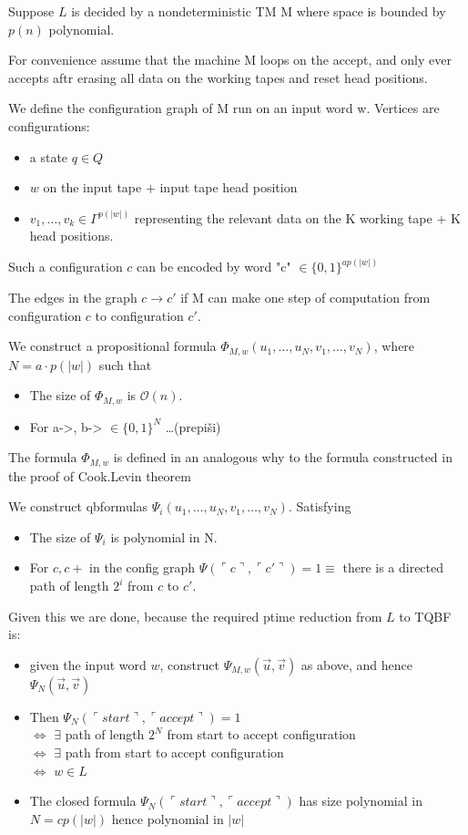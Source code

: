 \documentclass[a4paper,12pt]{article}
\theoremstyle{definition}
\theoremstyle{remark}
\begin{document}
Suppose $L$ is decided by a nondeterministic TM M where space is bounded by $p(n)$ polynomial.

For convenience assume that the machine M loops on the accept, and only ever accepts aftr erasing all data on the working tapes and reset head positions.

We define the configuration graph of M run on an input word w. Vertices are configurations:
\begin{itemize}
    \item a state $q \in Q$
    \item $w$ on the input tape + input tape head position
    \item $v_1, \dots, v_k \in \Gamma^{p(|w|)}$ representing the relevant data on the K working tape + K head positions. 
\end{itemize}

Such a configuration $c$ can be encoded by word "c" $\in \{0, 1\}^{a p(|w|)}$

The edges in the graph $c \to c'$ if M can make one step of computation from configuration $c$ to configuration $c'$.

We construct a propositional formula $\Phi_{M, w}(u_1, \dots, u_N, v_1, \dots, v_N)$, where $N = a \cdot p(|w|)$ such that
\begin{itemize}
    \item The size of $\Phi_{M, w}$ is $\mathscr{O}(n)$.
    \item For a->, b-> $\in \{0, 1\}^N$ \dots (prepiši)
\end{itemize}

The formula $\Phi_{M, w}$ is defined in an analogous why to the formula constructed in the proof of Cook.Levin theorem

We construct qbformulas $\Psi_i (u_1, \dots, u_N, v_1, \dots, v_N)$. Satisfying
\begin{itemize}
    \item The size of $\Psi_i$ is polynomial in N.
    \item For $c, c+$ in the config graph $\Psi(\ulcorner c \urcorner, \ulcorner c'\urcorner) = 1 \equiv $ there is a directed path of length $2^i$ from $c$ to $c'$.
\end{itemize}

Given this we are done, because the required ptime reduction from $L$ to TQBF is:
\begin{itemize}
    \item given the input word $w$, construct $\Psi_{M, w} (\vec{u}, \vec{v})$ as above, and hence $\Psi_N(\vec{u}, \vec{v})$
    \item Then $\Psi_N (\ulcorner start \urcorner, \ulcorner accept \urcorner) = 1$ \\
    $\iff$ $\exists$ path of length $2^N$ from start to accept configuration \\
    $\iff$ $\exists$ path from start to accept configuration \\
    $\iff$ $w \in L$
    \item The closed formula $\Psi_N (\ulcorner start \urcorner, \ulcorner accept \urcorner)$ has size polynomial in $N = cp(|w|)$ hence polynomial in $|w|$
\end{itemize}
\end{document}
